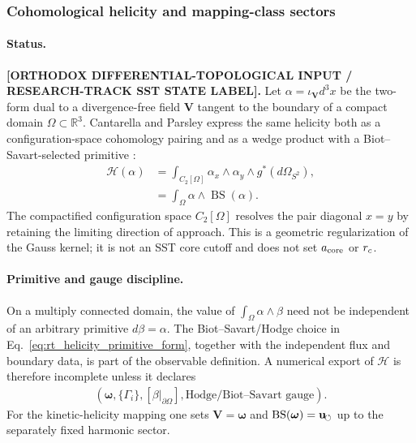 \subsubsection{Cohomological helicity and mapping-class sectors}
\label{subsubsec:rt_helicity_mapping_class}
\paragraph{Status.}
\textbf{[ORTHODOX DIFFERENTIAL-TOPOLOGICAL INPUT / RESEARCH-TRACK SST STATE LABEL].}
Let $\alpha=\iota_{\mathbf V}d^3x$ be the two-form dual to a divergence-free
field $\mathbf V$ tangent to the boundary of a compact domain
$\Omega\subset\mathbb R^3$.  Cantarella and Parsley express the same helicity
both as a configuration-space cohomology pairing and as a wedge product with a
Biot--Savart-selected primitive \cite{CantarellaParsley2010Helicity}:
\begin{align}
    \mathcal H(\alpha)
    &=
    \int_{C_2[\Omega]}
    \alpha_x\wedge\alpha_y\wedge g^*(d\Omega_{S^2}),
    \label{eq:rt_helicity_configuration_space}\\
    &=
    \int_{\Omega}\alpha\wedge\operatorname{BS}(\alpha).
    \label{eq:rt_helicity_primitive_form}
\end{align}
The compactified configuration space $C_2[\Omega]$ resolves the pair diagonal
$x=y$ by retaining the limiting direction of approach.  This is a geometric
regularization of the Gauss kernel; it is not an SST core cutoff and does not
set $a_{\rm core}$ or $r_c$.

\paragraph{Primitive and gauge discipline.}
On a multiply connected domain, the value of
$\int_{\Omega}\alpha\wedge\beta$ need not be independent of an arbitrary
primitive $d\beta=\alpha$.  The Biot--Savart/Hodge choice in
Eq.~\eqref{eq:rt_helicity_primitive_form}, together with the independent flux
and boundary data, is part of the observable definition.  A numerical export
of $\mathcal H$ is therefore incomplete unless it declares
\begin{align}
    \left(
        \boldsymbol\omega,
        \{\Gamma_i\},
        [\beta|_{\partial\Omega}],
        \text{Hodge/Biot--Savart gauge}
    \right).
    \label{eq:rt_helicity_gauge_metadata}
\end{align}
For the kinetic-helicity mapping one sets $\mathbf V=\boldsymbol\omega$ and
$\operatorname{BS}(\boldsymbol\omega)=\mathbf{u}_{\!\boldsymbol{\circlearrowleft}}$ up to the separately fixed
harmonic sector.

